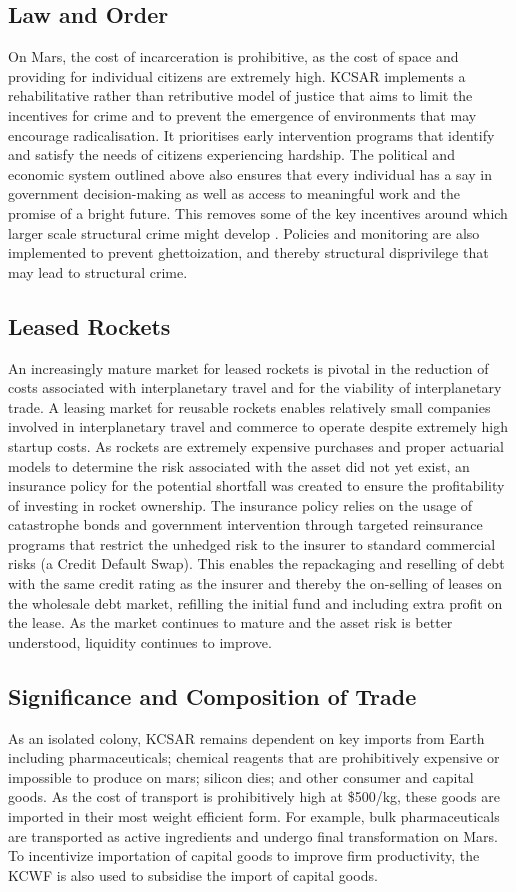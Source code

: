 \documentclass[fleqn,10pt]{Stylesheet} %
\begin{document}
\subsection{Law and Order}
On Mars, the cost of incarceration is prohibitive, as the cost of space and providing for individual citizens are extremely high. KCSAR implements a rehabilitative rather than retributive model of justice that aims to limit the incentives for crime and to prevent the emergence of environments that may encourage radicalisation. It prioritises early intervention programs that identify and satisfy the needs of citizens experiencing hardship. The political and economic system outlined above also ensures that every individual has a say in government decision-making as well as access to meaningful work and the promise of a bright future. This removes some of the key incentives around which larger scale structural crime might develop \cite{10.1093/bjc/azq067}. Policies and monitoring are also implemented to prevent ghettoization, and thereby structural disprivilege that may lead to structural crime. 

\subsection{Leased Rockets}
An increasingly mature market for leased rockets is pivotal in the reduction of costs associated with interplanetary travel and for the viability of interplanetary trade. A leasing market for reusable rockets enables relatively small companies involved in interplanetary travel and commerce to operate despite extremely high startup costs. As rockets are extremely expensive purchases and proper actuarial models to determine the risk associated with the asset did not yet exist, an insurance policy for the potential shortfall was created to ensure the profitability of investing in rocket ownership. The insurance policy relies on the usage of catastrophe bonds and government intervention through targeted reinsurance programs that restrict the unhedged risk to the insurer to standard commercial risks (a Credit Default Swap). This enables the repackaging and reselling of debt with the same credit rating as the insurer and thereby the on-selling of leases on the wholesale debt market, refilling the initial fund and including extra profit on the lease. As the market continues to mature and the asset risk is better understood, liquidity continues to improve.

\subsection{Significance and Composition of Trade}
As an isolated colony, KCSAR remains dependent on key imports from Earth including pharmaceuticals; chemical reagents that are prohibitively expensive or impossible to produce on mars; silicon dies; and other consumer and capital goods. As the cost of transport is prohibitively high at \$500/kg, these goods are imported in their most weight efficient form. For example, bulk pharmaceuticals are transported as active ingredients and undergo final transformation on Mars. To incentivize importation of capital goods to improve firm productivity, the KCWF is also used to subsidise the import of capital goods. 
\end{document}
